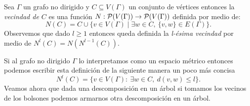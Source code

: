 \documentclass[tesis.tex]{subfiles}
\begin{document}
\begin{deff}
	Sea $\Gamma$ un grafo no dirigido y $C \subseteq V(\Gamma)$ un conjunto de vértices entonces la \emph{vecindad de $C$} es una función 
	$N: {\cal{P}}(V(\Gamma)) \to {\cal{P}}(V(\Gamma))$ definida por medio de:
	\[
	N(C) = C \cup \{ v \in V(\Gamma) \mid \exists w \in C, \ \{v,w \} \in E(\Gamma) \}.
	\]
	Observemos que dado $l \ge 1$ entonces queda definida la \emph{l-ésima vecindad} por medio de $N^l(C) = N(N^{l-1}(C))$.
\end{deff}


	Si al grafo no dirigido $\Gamma$ lo interpretamos como un espacio métrico entonces podemos escribir esta definición de la siguiente manera un poco más concisa
	\[
		N^l (C) = \{ v \in V(\Gamma) : \ \exists w \in C, \  d(v,w) \le l  \}.
	\]
	Veamos ahora que dada una descomposición en un árbol si tomamos los vecinos de los bolsones podemos armarnos otra descomposición en un árbol.
\end{document}
